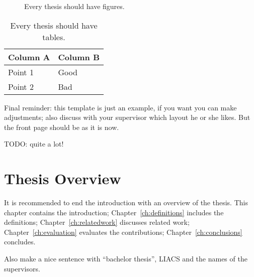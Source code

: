 \begin{figure}
\begin{center}

\end{center}
\caption{Every thesis should have figures.\label{fig:afigure}}
\end{figure}

\begin{table}
\begin{center}
\begin{tabular}{ll}
Column A & Column B\\
\hline
Point 1 & Good\\
Point 2 & Bad\\
\end{tabular}
\end{center}
\caption{Every thesis should have tables.\label{tab:atable}}
\end{table}

Final reminder: this template is just an example, if you want you can make adjustments; also discuss with your supervisor which layout he or she likes. But the front page should be as it is now.

TODO: quite a lot!

\section{Thesis Overview}
It is recommended to end the introduction with an overview of the thesis. This chapter contains the introduction; Chapter~\ref{ch:definitions} includes the definitions; Chapter~\ref{ch:relatedwork} discusses related work; Chapter~\ref{ch:evaluation} evaluates the contributions; Chapter~\ref{ch:conclusions} concludes.

Also make a nice sentence with ``bachelor thesis'', LIACS and the names of the supervisors.

